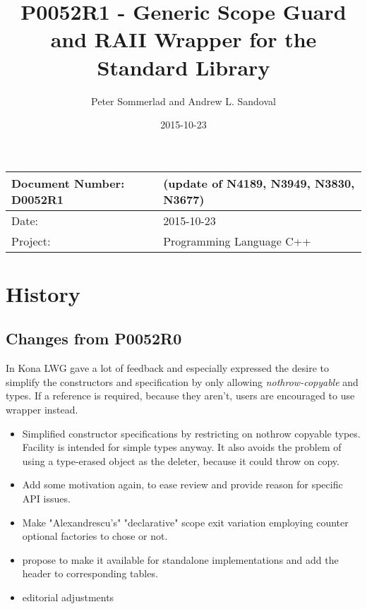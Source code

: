 \documentclass[ebook,11pt,article]{memoir}
\title{P0052R1 - Generic Scope Guard and RAII Wrapper for the Standard Library}
\author{Peter Sommerlad and Andrew L. Sandoval}
\date{2015-10-23}                                           %
\begin{document}
\maketitle
\begin{tabular}[t]{|l|l|}\hline 
Document Number: D0052R1 &   (update of N4189, N3949, N3830, N3677)\\\hline
Date: & 2015-10-23 \\\hline
Project: & Programming Language C++\\\hline 
\end{tabular}

\chapter{History}

\section{Changes from P0052R0}
In Kona LWG gave a lot of feedback and especially expressed the desire to simplify the constructors and specification by only allowing \emph{nothrow-copyable}  and  types. If a reference is required, because they aren't, users are encouraged to use  wrapper instead.
\begin{itemize}
\item Simplified constructor specifications by restricting on nothrow copyable types. Facility is intended for simple types anyway. It also avoids the problem of using a type-erased  object as the deleter, because it could throw on copy.
\item Add some motivation again, to ease review and provide reason for specific API issues.
\item Make "Alexandrescu's" "declarative" scope exit variation employing  counter optional factories to chose or not.
\item propose to make it available for standalone implementations and add the header  to corresponding tables.
\item editorial adjustments
\end{itemize}
\end{document}
